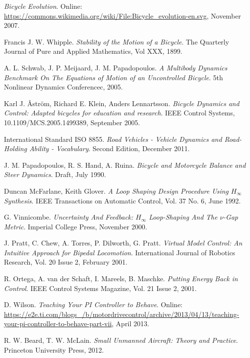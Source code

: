 \begin{thebibliography}{9}
\textit{Bicycle Evolution}. Online: \url{https://commons.wikimedia.org/wiki/File:Bicycle_evolution-en.svg}, November 2007.

Francis J. W. Whipple. \textit{Stability of the Motion of a Bicycle}. The Quarterly Journal of Pure and Applied Mathematics, Vol XXX, 1899.

A. L. Schwab, J. P. Meijaard, J. M. Papadopoulos. \textit{A Multibody Dynamics Benchmark On The Equations of Motion of an Uncontrolled Bicycle}. 5th Nonlinear Dynamics Conferencec, 2005. 

Karl J. \AA str{\"o}m, Richard E. Klein, Anders Lennartsson. \textit{Bicycle Dynamics and Control: Adapted bicycles for education and research}. IEEE Control Systems, 10.1109/MCS.2005.1499389, September 2005.
 
International Standard ISO 8855. \textit{Road Vehicles - Vehicle Dynamics and Road-Holding Ability - Vocabulary}. Second Edition, December 2011.

J. M. Papadopoulos, R. S. Hand, A. Ruina. \textit{Bicycle and Motorcycle Balance and Steer Dynamics}. Draft, July 1990.

Duncan McFarlane, Keith Glover. 
\textit{A Loop Shaping Design Procedure Using $H_{\infty}$ Synthesis}. IEEE Transactions on Automatic Control, Vol. 37 No. 6, June 1992.

G. Vinnicombe. \textit{Uncertainty And Feedback: $H_{\infty}$ Loop-Shaping And The $\nu$-Gap Metric}. Imperial College Press, November 2000.

J. Pratt, C. Chew, A. Torres, P. Dilworth, G. Pratt. \textit{Virtual Model Control: An Intuitive Approach for Bipedal Locomotion}. International Journal of Robotics Research, Vol. 20 Issue 2, February 2001.

R. Ortega, A. van der Schaft, I. Mareels, B. Maschke. \textit{Putting Energy Back in Control}. IEEE Control Systems Magazine, Vol. 21 Issue 2, 2001.

D. Wilson. \textit{Teaching Your PI Controller to Behave}. Online: \url{https://e2e.ti.com/blogs_/b/motordrivecontrol/archive/2013/04/13/teaching-your-pi-controller-to-behave-part-vii}, April 2013.

R. W. Beard, T. W. McLain. \textit{Small Unmanned Aircraft: Theory and Practice}. Princeton University Press, 2012.

\end{thebibliography}